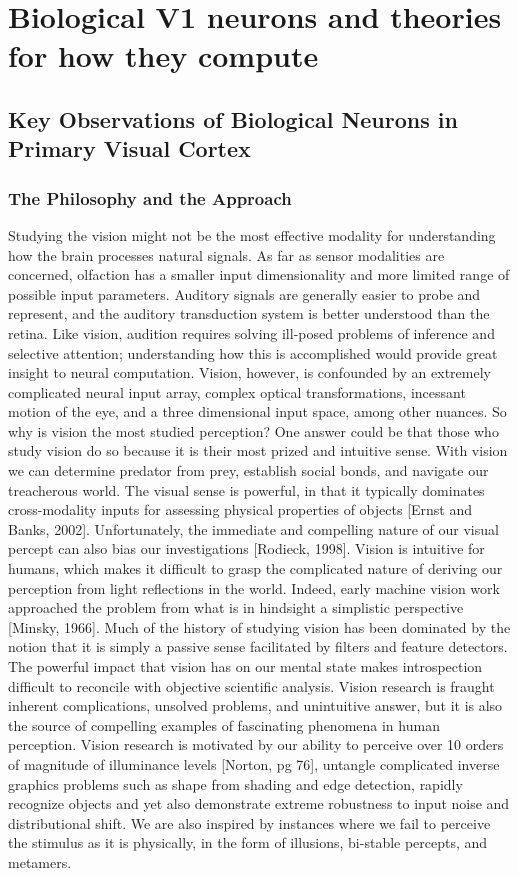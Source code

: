 \chapter{Biological V1 neurons and theories for how they compute}

\section{Key Observations of Biological Neurons in Primary Visual Cortex}

\subsection{The Philosophy and the Approach}
Studying the vision might not be the most effective modality for understanding how the brain processes natural signals. As far as sensor modalities are concerned, olfaction has a smaller input dimensionality and more limited range of possible input parameters. Auditory signals are generally easier to probe and represent, and the auditory transduction system is better understood than the retina. Like vision, audition requires solving ill-posed problems of inference and selective attention; understanding how this is accomplished would provide great insight to neural computation. Vision, however, is confounded by an extremely complicated neural input array, complex optical transformations, incessant motion of the eye, and a three dimensional input space, among other nuances. So why is vision the most studied perception? One answer could be that those who study vision do so because it is their most prized and intuitive sense. With vision we can determine predator from prey, establish social bonds, and navigate our treacherous world. The visual sense is powerful, in that it typically dominates cross-modality inputs for assessing physical properties of objects [Ernst and Banks, 2002]. Unfortunately, the immediate and compelling nature of our visual percept can also bias our investigations [Rodieck, 1998]. Vision is intuitive for humans, which makes it difficult to grasp the complicated nature of deriving our perception from light reflections in the world. Indeed, early machine vision work approached the problem from what is in hindsight a simplistic perspective [Minsky, 1966]. Much of the history of studying vision has been dominated by the notion that it is simply a passive sense facilitated by filters and feature detectors. The powerful impact that vision has on our mental state makes introspection difficult to reconcile with objective scientific analysis. Vision research is fraught inherent complications, unsolved problems, and unintuitive answer, but it is also the source of compelling examples of fascinating phenomena in human perception. Vision research is motivated by our ability to perceive over 10 orders of magnitude of illuminance levels [Norton, pg 76], untangle complicated inverse graphics problems such as shape from shading and edge detection, rapidly recognize objects and yet also demonstrate extreme robustness to input noise and distributional shift. We are also inspired by instances where we fail to perceive the stimulus as it is physically, in the form of illusions, bi-stable percepts, and metamers. 
